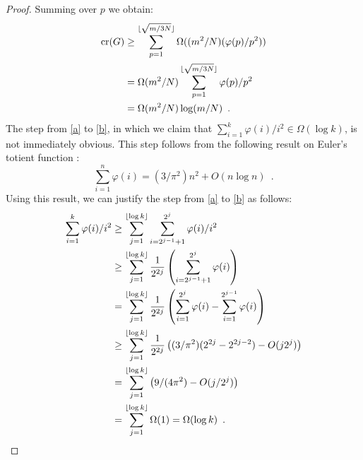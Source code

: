 \documentclass{patmorin}
\newcommand{\n}{N}
\DeclareMathOperator{\crs}{cr}
\begin{document}
\begin{proof}
  Summing over $p$ we obtain:
  \begin{align}
     \crs(G) & \ge \sum_{p=1}^{\lfloor\sqrt{m/3\n}\rfloor} \Omega((m^2/\n)(\varphi(p)/p^2)) \\
             & = \Omega(m^2/\n)\sum_{p=1}^{\lfloor\sqrt{m/3\n}\rfloor} \varphi(p)/p^2 \eqlabel{a} \\
             & = \Omega(m^2/\n)\log(m/\n) \enspace . \eqlabel{b}
  \end{align}
  The step from \eqref{a} to \eqref{b}, in which we claim that
  $\sum_{i=1}^k \varphi(i)/i^2\in\Omega(\log k)$, is not immediately
  obvious.
  This step follows from the following result on Euler's
  totient function \cite[Theorem~330]{hardy.wright:introduction}:
  \[
      \sum_{i=1}^n \varphi(i) = (3/\pi^2)n^2 + O(n\log n) \enspace .
  \]
  Using this result, we can justify the step from \eqref{a} to \eqref{b}
  as follows:
  \begin{align*}
    \sum_{i=1}^k \varphi(i)/i^2 
      &\ge \sum_{j=1}^{\lfloor\log k\rfloor}
             \sum_{i=2^{j-1}+1}^{2^j} \varphi(i)/i^2  \\
      &\ge \sum_{j=1}^{\lfloor\log k\rfloor}\frac{1}{2^{2j}}
             \left(\sum_{i=2^{j-1}+1}^{2^j} \varphi(i)\right)  \\
      &= \sum_{j=1}^{\lfloor\log k\rfloor}\frac{1}{2^{2j}}
             \left(\sum_{i=1}^{2^j}\varphi(i)-\sum_{i=1}^{2^{j-1}} \varphi(i)\right)  \\
      &\ge \sum_{j=1}^{\lfloor\log k\rfloor}\frac{1}{2^{2j}}
             \left((3/\pi^2)(2^{2j}-2^{2j-2})- O(j2^j)\right)  \\
      &= \sum_{j=1}^{\lfloor\log k\rfloor}
             \left(9/(4\pi^2)- O(j/2^{j})\right)  \\
      &= \sum_{j=1}^{\lfloor\log k\rfloor} \Omega(1) = \Omega(\log k) \enspace . \qedhere
  \end{align*}
\end{proof}
\end{document}
